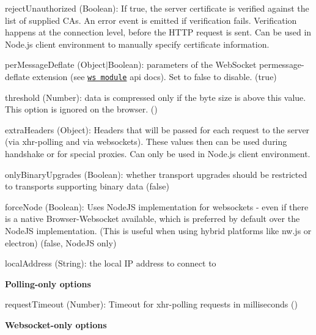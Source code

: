 \begin{DoxyItemize}
\begin{DoxyItemize}
\begin{DoxyItemize}
\item {\ttfamily reject\+Unauthorized} ({\ttfamily Boolean})\+: If true, the server certificate is verified against the list of supplied C\+As. An \textquotesingle{}error\textquotesingle{} event is emitted if verification fails. Verification happens at the connection level, before the H\+T\+TP request is sent. Can be used in Node.\+js client environment to manually specify certificate information.
\item {\ttfamily per\+Message\+Deflate} ({\ttfamily Object$\vert$\+Boolean})\+: parameters of the Web\+Socket permessage-\/deflate extension (see \href{https://github.com/einaros/ws}{\tt ws module} api docs). Set to {\ttfamily false} to disable. ({\ttfamily true})
\begin{DoxyItemize}
\item {\ttfamily threshold} ({\ttfamily Number})\+: data is compressed only if the byte size is above this value. This option is ignored on the browser. ({})
\end{DoxyItemize}
\item {\ttfamily extra\+Headers} ({\ttfamily Object})\+: Headers that will be passed for each request to the server (via xhr-\/polling and via websockets). These values then can be used during handshake or for special proxies. Can only be used in Node.\+js client environment.
\item {\ttfamily only\+Binary\+Upgrades} ({\ttfamily Boolean})\+: whether transport upgrades should be restricted to transports supporting binary data ({\ttfamily false})
\item {\ttfamily force\+Node} ({\ttfamily Boolean})\+: Uses Node\+JS implementation for websockets -\/ even if there is a native Browser-\/\+Websocket available, which is preferred by default over the Node\+JS implementation. (This is useful when using hybrid platforms like nw.\+js or electron) ({\ttfamily false}, Node\+JS only)
\item {\ttfamily local\+Address} ({\ttfamily String})\+: the local IP address to connect to
\end{DoxyItemize}
\item {\bfseries Polling-\/only options}
\begin{DoxyItemize}
\item {\ttfamily request\+Timeout} ({\ttfamily Number})\+: Timeout for xhr-\/polling requests in milliseconds ({})
\end{DoxyItemize}
\item {\bfseries Websocket-\/only options}

\end{DoxyItemize}
\end{DoxyItemize}
